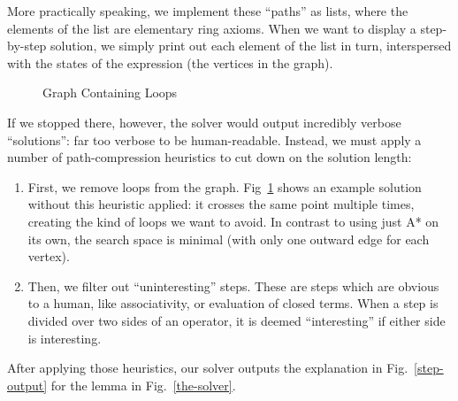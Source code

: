 \documentclass[acmsmall,review,anonymous]{acmart}\settopmatter{printfolios=true,printccs=false,printacmref=false}
\theoremstyle{remark}
\begin{document}
More practically speaking, we implement these ``paths'' as lists, where the
elements of the list are elementary ring axioms. When we want to display a
step-by-step solution, we simply print out each element of the list in turn,
interspersed with the states of the expression (the vertices in the graph).

\begin{figure}
  \vspace{-10pt}
  \vspace{-15pt}
  \caption{Graph Containing Loops}
  \label{h-graph}
  \vspace{-20pt}
\end{figure}

If we stopped there, however, the solver would output incredibly verbose
``solutions'': far too verbose to be human-readable. Instead, we must apply a
number of path-compression heuristics to cut down on the solution length:
\begin{enumerate}
  \item First, we remove loops from the graph. Fig~\ref{h-graph} shows an
    example solution without this heuristic applied: it crosses the same point
    multiple times, creating the kind of loops we want to avoid. In contrast to
    using just A* on its own, the search space is minimal (with only one outward
    edge for each vertex).
  \item Then, we filter out ``uninteresting'' steps. These are steps which are
    obvious to a human, like associativity, or evaluation of closed terms. When
    a step is divided over two sides of an operator, it is deemed
    ``interesting'' if either side is interesting.
\end{enumerate}
After applying those heuristics, our solver outputs the explanation in
Fig.~\ref{step-output} for the lemma in Fig.~\ref{the-solver}.
\end{document}
